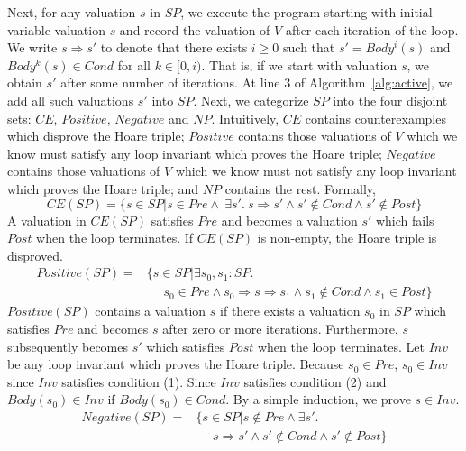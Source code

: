 Next, for any valuation $s$ in $SP$, we execute the program starting with initial variable valuation $s$ and record the valuation of $V$ after each iteration of the loop. We write $s \Rightarrow s'$ to denote that there exists $i \geq 0$ such that $s' = Body^i(s)$ and $Body^k(s) \in Cond$ for all $k \in [0, i)$. That is, if we start with valuation $s$, we obtain $s'$ after some number of iterations. At line 3 of Algorithm~\ref{alg:active}, we add all such valuations $s'$ into $SP$. Next, we categorize $SP$ into the four disjoint sets: $CE$, $Positive$, $Negative$ and $NP$. Intuitively, $CE$ contains counterexamples which disprove the Hoare triple; $Positive$ contains those valuations of $V$ which we know must satisfy any loop invariant which proves the Hoare triple; $Negative$ contains those valuations of $V$ which we know must not satisfy any loop invariant which proves the Hoare triple; and $NP$ contains the rest. Formally,
\[
CE(SP) = \{s \in SP |s \in Pre \land~\exists s'.~s \Rightarrow s' \land s' \not \in Cond \land s' \not \in Post\} \]
A valuation in $CE(SP)$ satisfies $Pre$ and becomes a valuation $s'$ which fails $Post$ when the loop terminates. If $CE(SP)$ is non-empty, the Hoare triple is disproved.
\begin{align*}
Positive(SP) = & \{s \in SP | \exists s_0,s_1: SP. \\
& ~~~~~~ s_0 \in Pre \land s_0 \Rightarrow s \Rightarrow s_1 \land s_1 \not \in Cond \land s_1 \in Post\}
\end{align*}
$Positive(SP)$ contains a valuation $s$ if there exists a valuation $s_0$ in $SP$ which satisfies $Pre$ and becomes $s$ after zero or more iterations. Furthermore, $s$ subsequently becomes $s'$ which satisfies $Post$ when the loop terminates. Let $Inv$ be any loop invariant which proves the Hoare triple. Because $s_0 \in Pre$, $s_0 \in Inv$ since $Inv$ satisfies condition (1). Since $Inv$ satisfies condition (2) and $Body(s_0) \in Inv$ if $Body(s_0) \in Cond$. By a simple induction, we prove $s \in Inv$.
\begin{align*}
    Negative(SP) = & \{s \in SP | s \not \in Pre \land \exists s'. \\
    & ~~~~~~s \Rightarrow s' \land s' \not \in Cond \land s' \not \in Post\}
\end{align*}
